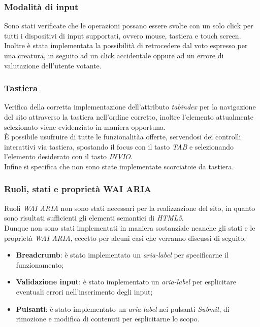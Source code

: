 \subsubsection{Modalità di input}
\label{subsubsec:accessibility-input}
Sono stati verificate che le operazioni possano essere svolte con un solo click per tutti i dispositivi di input supportati, ovvero mouse, tastiera e touch screen. \\
Inoltre è stata implementata la possibilità di retrocedere dal voto espresso per una creatura, in seguito ad un click accidentale oppure ad un errore di valutazione dell'utente votante.

\subsubsection{Tastiera}
\label{subsubsec:accessibility-keyboard}
Verifica della corretta implementazione dell'attributo \textit{tabindex} per la navigazione del sito attraverso la tastiera nell'ordine corretto, inoltre l'elemento attualmente selezionato viene evidenziato in maniera opportuna. \\
È possibile usufruire di tutte le funzionalitàa offerte, servendosi dei controlli interattivi via tastiera, spostando il focus con il tasto \textit{TAB} e selezionando l'elemento desiderato con il tasto \textit{INVIO}. \\
Infine si specifica che non sono state implementate scorciatoie da tastiera.

\subsubsection{Ruoli, stati e proprietà WAI ARIA}
\label{subsubsec:accessibility-aria}

Ruoli \textit{WAI ARIA} non sono stati necessari per la realizzazione del sito, in quanto sono risultati sufficienti gli elementi semantici di \textit{HTML5}. \\
Dunque non sono stati implementati in maniera sostanziale neanche gli stati e le proprietà \textit{WAI ARIA}, eccetto per alcuni casi che verranno discussi di seguito:
\begin{itemize}
    \item \textbf{Breadcrumb}: è stato implementato un \textit{aria-label} per specificarne il funzionamento;
    \item \textbf{Validazione input}: è stato implementato un \textit{aria-label} per esplicitare eventuali errori nell'inserimento degli input;
    \item \textbf{Pulsanti}: è stato implementato un \textit{aria-label} nei pulsanti \textit{Submit}, di rimozione e modifica di contenuti per esplicitarne lo scopo.
\end{itemize}

